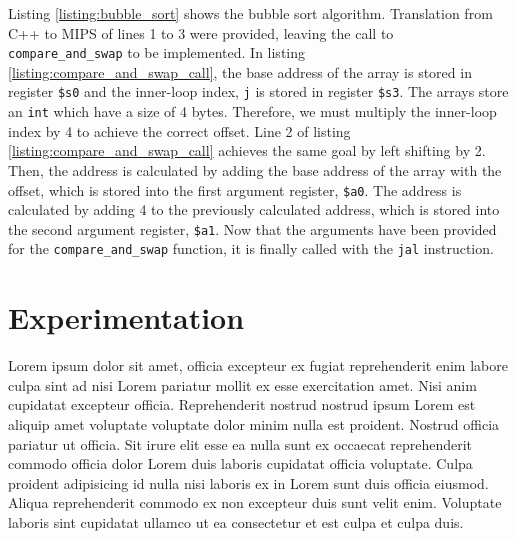 \documentclass[11pt]{report}
\begin{document}


Listing \ref{listing:bubble_sort} shows the bubble sort algorithm. Translation from C++ to MIPS of
lines 1 to 3 were provided, leaving the call to \verb|compare_and_swap| to be implemented. In
listing \ref{listing:compare_and_swap_call}, the base address of the array is stored in register
\verb|$s0| and the inner-loop index, \verb|j| is stored in register \verb|$s3|. The arrays store an
\verb|int| which have a size of 4 bytes. Therefore, we must multiply the inner-loop index by 4 to
achieve the correct offset. Line 2 of listing \ref{listing:compare_and_swap_call} achieves the same
goal by left shifting by 2. Then, the address  is calculated by adding the base
address of the array with the offset, which is stored into the first argument register, \verb|$a0|.
The address  is calculated by adding 4 to the previously calculated address,
which is stored into the second argument register, \verb|$a1|. Now that the arguments have been
provided for the \verb|compare_and_swap| function, it is finally called with the \verb|jal|
instruction.

\section*{Experimentation}
Lorem ipsum dolor sit amet, officia excepteur ex fugiat reprehenderit enim labore culpa sint ad nisi
Lorem pariatur mollit ex esse exercitation amet. Nisi anim cupidatat excepteur officia.
Reprehenderit nostrud nostrud ipsum Lorem est aliquip amet voluptate voluptate dolor minim nulla est
proident. Nostrud officia pariatur ut officia. Sit irure elit esse ea nulla sunt ex occaecat
reprehenderit commodo officia dolor Lorem duis laboris cupidatat officia voluptate. Culpa proident
adipisicing id nulla nisi laboris ex in Lorem sunt duis officia eiusmod. Aliqua reprehenderit
commodo ex non excepteur duis sunt velit enim. Voluptate laboris sint cupidatat ullamco ut ea
consectetur et est culpa et culpa duis.
\end{document}
